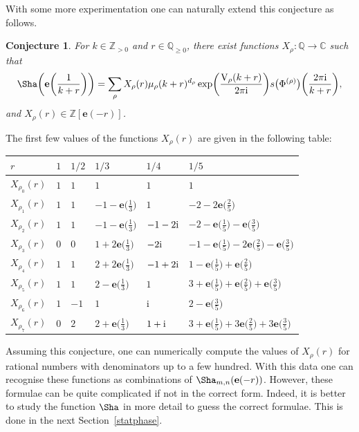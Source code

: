 \documentclass[pdftex]{sigma}
\numberwithin{equation}{section}
\newtheorem{Conjecture}[Theorem]{Conjecture}
\def\BZ{\mathbb{Z}}
\def\BQ{\mathbb{Q}}
\def\BC{\mathbb{C}}
\def\e{\mathbf e}
\def\VC{\mathrm{VC}}
\def\WRT{\Sha}
\def\BZ{\mathbb Z}
\def\BQ{\mathbb Q}
\def\BC{\mathbb C}
\def\VC{\mathrm{V}}
\begin{document}
With some more experimentation one can naturally extend this conjecture as follows.
\begin{Conjecture}\label{conj.qmod.hab.Borel}
For $k\in\BZ_{>0}$ and $r\in\BQ_{\geq 0}$, there exist functions $X_{\rho}\colon \BQ\rightarrow\BC$ such that
\[
 \WRT\biggl(\e\biggl(\frac{1}{k+r}\biggr)\biggr)
  =
 \sum_{\rho}X_\rho(r)\mu_{\rho}(k+r)^{d_\rho}\exp\biggl(\frac{\VC_{\rho}(k+r)}{2\pi {\rm i}}\biggr)s\bigl(\Phi^{(\rho)}\bigr)\biggl(\frac{2\pi {\rm i}}{k+r}\biggr) ,
\]
and $X_{\rho}(r)\in\BZ[\e(-r)]$.
\end{Conjecture}
The first few values of the functions $X_{\rho}(r)$ are given in the following table:
\begin{center}
\def\arraystretch{1.2}
\begin{tabular}{|l|l|l|l|l|l|}\hline
$r$ & $1$ & $1/2$ & $1/3$ & $1/4$ & $1/5$ \\ \hline
$X_{\rho_0}(r)$ & $1$ & $1$ & $1$ & $1$ & $1$ \\ \hline
$X_{\rho_1}(r)$ & $1$ & $1$ & $-1-\e\bigl(\frac{1}{3}\bigr)$ & $1$ & $-2-2\e\bigl(\frac{2}{5}\bigr)$ \\ \hline
$X_{\rho_2}(r)$ & $1$ & $1$ & $-1-\e\bigl(\frac{1}{3}\bigr)$ & $-1-2{\rm i}$ & $-2-\e\bigl(\frac{1}{5}\bigr)-\e\bigl(\frac{3}{5}\bigr)$ \\ \hline
$X_{\rho_3}(r)$ & $0$ & $0$ & $1+2\e\bigl(\frac{1}{3}\bigr)$ & $-2{\rm i}$ & $-1-\e\bigl(\frac{1}{5}\bigr)-2\e\bigl(\frac{2}{5}\bigr)-\e\bigl(\frac{3}{5}\bigr)$ \\ \hline
$X_{\rho_4}(r)$ & $1$ & $1$ & $2+2\e\bigl(\frac{1}{3}\bigr)$ & $-1+2{\rm i}$ & $1-\e\bigl(\frac{1}{5}\bigr)+\e\bigl(\frac{2}{5}\bigr)$ \\ \hline
$X_{\rho_5}(r)$ & $1$ & $1$ & $2-\e\bigl(\frac{1}{3}\bigr)$ & $1$ & $3+\e\bigl(\frac{1}{5}\bigr)+\e\bigl(\frac{2}{5}\bigr)+\e\bigl(\frac{3}{5}\bigr)$ \\ \hline
$X_{\rho_6}(r)$ & $1$ & $-1$ & $1$ & ${\rm i}$ & $2-\e\bigl(\frac{3}{5}\bigr)$ \\ \hline
$X_{\rho_7}(r)$ & $0$ & $2$ & $2+\e\bigl(\frac{1}{3}\bigr)$ & $1+{\rm i}$ & $3+\e\bigl(\frac{1}{5}\bigr)+3\e\bigl(\frac{2}{5}\bigr)+3\e\bigl(\frac{3}{5}\bigr)$ \\ \hline
\end{tabular}
\end{center}



Assuming this conjecture, one can numerically compute the values of $X_{\rho}(r)$ for rational numbers with denominators up to a few hundred. With this data one can recognise these functions as combinations of $\WRT_{m,n}(\e(-r))$. However, these formulae can be quite complicated if not in the correct form. Indeed, it is better to study the function $\WRT$ in more detail to guess the correct formulae. This is done in the next Section~\ref{statphase}.
\end{document}
